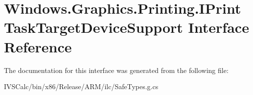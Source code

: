 \hypertarget{interface_windows_1_1_graphics_1_1_printing_1_1_i_print_task_target_device_support}{}\section{Windows.\+Graphics.\+Printing.\+I\+Print\+Task\+Target\+Device\+Support Interface Reference}
\label{interface_windows_1_1_graphics_1_1_printing_1_1_i_print_task_target_device_support}


The documentation for this interface was generated from the following file\+:\begin{DoxyCompactItemize}
\item 
I\+V\+S\+Calc/bin/x86/\+Release/\+A\+R\+M/ilc/Safe\+Types.\+g.\+cs\end{DoxyCompactItemize}
